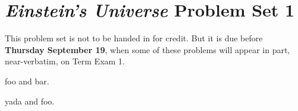 \documentclass[12pt, letterpaper]{article}
\begin{document}
\section*{\textsl{Einstein's Universe} Problem Set 1}

This problem set is not to be handed in for credit. But it is due
before \textbf{Thursday September 19}, when some of these problems
will appear in part, near-verbatim, on Term Exam 1.

\begin{problem}
foo and bar.
\end{problem}

\begin{problem}
yada and foo.
\end{problem}
\end{document}
